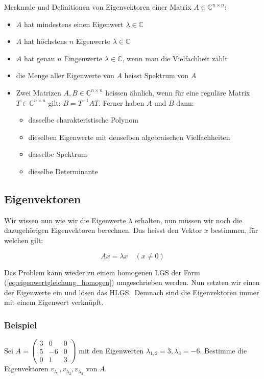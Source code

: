 \vspace{1\baselineskip}

Merkmale und Definitionen von Eigenvektoren einer Matrix \( A \in \mathbb{C}^{n \times n} \):

\begin{itemize}
    \item \( A \) hat mindestens einen Eigenwert \( \lambda \in \mathbb{C} \)
    \item \( A \) hat höchstens \( n \) Eigenwerte \( \lambda \in \mathbb{C} \)
    \item \( A \) hat genau \( n \) Eingenwerte \( \lambda \in \mathbb{C} \), wenn man die Vielfachheit zählt
    \item die Menge aller Eigenwerte von \( A \) heisst Spektrum von \( A \) 
    \item Zwei Matrizen \( A, B \in \mathbb{C}^{n \times n} \) heissen ähnlich, wenn für eine reguläre Matrix \( T \in \mathbb{C}^{n \times n} \) gilt: \( B = T^{-1} A T \). Ferner haben \( A \) und \( B \) dann:
    \begin{itemize}
        \item dasselbe charakteristische Polynom
        \item dieselben Eigenwerte mit denselben algebraischen Vielfachheiten
        \item dasselbe Spektrum
        \item dieselbe Determinante
    \end{itemize}
\end{itemize}

\subsection{Eigenvektoren}

Wir wissen nun wie wir die Eigenwerte \( \lambda \) erhalten, nun müssen wir noch die dazugehörigen Eigenvektoren berechnen. Das heisst den Vektor \( x \) bestimmen, für welchen gilt:

\begin{equation*}
    Ax = \lambda x \quad (x \neq 0)
\end{equation*}

Das Problem kann wieder zu einem homogenen LGS der Form (\ref{eq:eigenwertgleichung_homogen}) umgeschrieben werden. Nun setzten wir einen der Eigenwerte ein und lösen das HLGS.\ Demnach sind die Eigenvektoren immer mit einem Eigenwert verknüpft.

\subsubsection*{Beispiel}
Sei \( A = \begin{pmatrix} 3 & 0 & 0 \\ 5 & -6 & 0 \\ 0 & 1 & 3 \end{pmatrix} \) mit den Eigenwerten \( \lambda_{1,2} = 3, \lambda_3 = -6 \). Bestimme die Eigenvektoren \( v_{\lambda_1}, v_{\lambda_2}, v_{\lambda_3} \) von \( A \).

